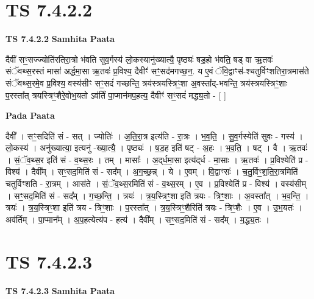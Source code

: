 \documentclass[17pt]{extarticle}
\begin{document}
\section*{ TS 7.4.2.2 }

\textbf{TS 7.4.2.2 } \newline
\textbf{Samhita Paata} \newline

दैवी॑ सꣳ॒॒सज्ज्योति॑रतिरा॒त्रो भ॑वति सुव॒र्गस्य॑ लो॒कस्यानु॑ख्यात्यै॒ पृष्ठ्यः॑ षड॒हो भ॑वति॒ षड् वा ऋ॒तवः॑ संॅवथ्स॒रस्तं मासा॑ अर्द्धमा॒सा ऋ॒तवः॑ प्र॒विश्य॒ दैवीꣳ॑ सꣳ॒॒सद॑मगच्छ॒न॒. य ए॒वं ॅवि॒द्वाꣳस॑-श्चतुर्विꣳशतिरा॒त्रमास॑ते संॅवथ्स॒रमे॒व प्र॒विश्य॒ वस्य॑सीꣳ सꣳ॒॒सदं॑ गच्छन्ति॒ त्रय॑स्त्रयस्त्रिꣳ॒॒शा अ॒वस्ता᳚द्-भवन्ति॒ त्रय॑स्त्रयस्त्रिꣳ॒॒शाः प॒रस्ता᳚त् त्रयस्त्रिꣳ॒॒शैरे॒वोभ॒यतो ऽव॑र्तिं पा॒प्मान॑मप॒हत्य॒ दैवीꣳ॑ सꣳ॒॒सदं॑ मद्ध्य॒तो - [  ] \newline

\textbf{Pada Paata} \newline

दैवी᳚ । सꣳ॒॒सदिति॑ सं - सत् । ज्योतिः॑ । अ॒ति॒रा॒त्र इत्य॑ति - रा॒त्रः । भ॒व॒ति॒ । सु॒व॒र्गस्येति॑ सुवः - गस्य॑ । लो॒कस्य॑ । अनु॑ख्यात्या॒ इत्यनु॑ -ख्या॒त्यै॒ । पृष्ठ्यः॑ । ष॒ड॒ह इति॑ षट् - अ॒हः । भ॒व॒ति॒ । षट् । वै । ऋ॒तवः॑ । सं॒ॅव॒थ्स॒र इति॑ सं - व॒थ्स॒रः । तम् । मासाः᳚ । अ॒द्‌र्ध॒मा॒सा इत्य॑द्‌र्ध - मा॒साः । ऋ॒तवः॑ । प्र॒विश्येति॑ प्र - विश्य॑ । दैवी᳚म् । सꣳ॒॒सद॒मिति॑ सं - सद᳚म् । अ॒ग॒च्छ॒न्न् । ये । ए॒वम् । वि॒द्वाꣳसः॑ । च॒तु॒र्विꣳ॒॒श॒ति॒रा॒त्रमिति॑ चतुर्विꣳशति - रा॒त्रम् । आस॑ते । सं॒ॅव॒थ्स॒रमिति॑ सं - व॒थ्स॒रम् । ए॒व । प्र॒विश्येति॑ प्र - विश्य॑ । वस्य॑सीम् । सꣳ॒॒सद॒मिति॑ सं - सद᳚म् । ग॒च्छ॒न्ति॒ । त्रयः॑ । त्र॒य॒स्त्रिꣳ॒॒शा इति॑ त्रयः - त्रिꣳ॒॒शाः । अ॒वस्ता᳚त् । भ॒व॒न्ति॒ । त्रयः॑ । त्र॒य॒स्त्रिꣳ॒॒शा इति॑ त्रय - त्रिꣳ॒॒शाः । प॒रस्ता᳚त् । त्र॒य॒स्त्रिꣳ॒॒शैरिति॑ त्रयः - त्रिꣳ॒॒शैः । ए॒व । उ॒भ॒यतः॑ । अव॑र्तिम् । पा॒प्मान᳚म् । अ॒प॒हत्येत्य॑प - हत्य॑ । दैवी᳚म् । सꣳ॒॒सद॒मिति॑ सं - सद᳚म् । म॒द्ध्य॒तः ।  \newline




\section*{ TS 7.4.2.3 }

\textbf{TS 7.4.2.3 } \newline
\textbf{Samhita Paata} \newline
\end{document}
